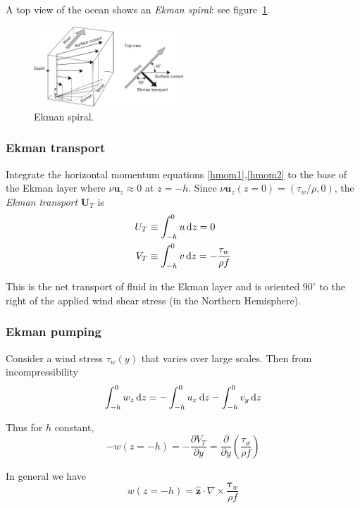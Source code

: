 \documentclass{jknotes}
\begin{document}
A top view of the ocean shows an \emph{Ekman spiral}: see
figure~\ref{fig:ekman}.
\begin{figure}
	\centering
	\includegraphics[width=0.5\textwidth]{ekman_spiral.jpg}
	\caption{Ekman spiral.}
	\label{fig:ekman}
\end{figure}

\subsubsection{Ekman transport}
Integrate the horizontal momentum equations \eqref{hmom1},\eqref{hmom2} to the
base of the Ekman layer where $\nu \symbf{u}_z \approx 0$ at $z=-h$. Since $\nu
\symbf{u}_z (z=0) = (\tau_w/\rho, 0)$, the \emph{Ekman transport} $\symbf{U}_T$ is
\begin{equation}
	\begin{aligned}
		U_T &\equiv \int_{-h}^0 u \, \diffd z = 0 \\
		V_T &\equiv \int_{-h}^0 v \, \diffd z = -\frac{\tau_w}{\rho f}
	\end{aligned}
\end{equation}

This is the net transport of fluid in the Ekman layer and is oriented
$90^{\circ}$ to the right of the applied wind shear stress (in the Northern
Hemisphere).

\subsubsection{Ekman pumping}
Consider a wind stress $\tau_w(y)$ that varies over large scales. Then from
incompressibility
\begin{equation}
	\int_{-h}^0 w_z \, \diffd z = -\int_{-h}^0 u_x \, \diffd z - \int_{-h}^0
	v_y \, \diffd z
\end{equation}

Thus for $h$ constant, 
\begin{equation}-w(z=-h) = -\frac{\partial V_T}{\partial y} =
\frac{\partial}{\partial y}\left( \frac{\tau_w}{\rho f}\right)
\end{equation}

In general we have
\begin{equation}
	w(z=-h) = \hat{\symbf{z}} \cdot \nabla \times \frac{\symbf{\tau}_w}{\rho f}
\end{equation}
\end{document}
